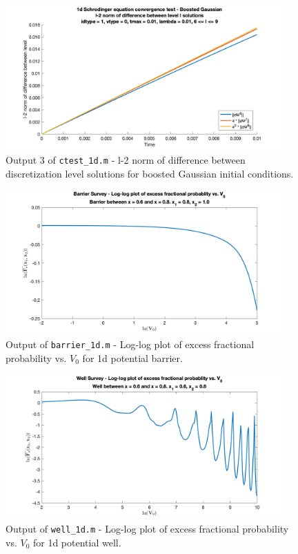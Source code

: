 \documentclass[10pt]{article}
\def\code#1{\texttt{#1}} %
\begin{document}
\begin{figure}[H]
\centering
\includegraphics[width=0.95\textwidth]{problem1/ctest_1d-3.png}
\caption{Output 3 of \code{ctest\_1d.m} - 
l-2 norm of difference between discretization level solutions for boosted Gaussian initial 
conditions.}
\end{figure}


\begin{figure}[H]
\centering
\includegraphics[width=0.95\textwidth]{problem1/barrier_1d.png}
\caption{Output of \code{barrier\_1d.m} - 
Log-log plot of excess fractional probability vs. $V_0$ for 1d potential barrier.}
\end{figure}

\begin{figure}[H]
\centering
\includegraphics[width=0.95\textwidth]{problem1/well_1d.png}
\caption{Output of \code{well\_1d.m} - 
Log-log plot of excess fractional probability vs. $V_0$ for 1d potential well.}
\end{figure}
\end{document}
